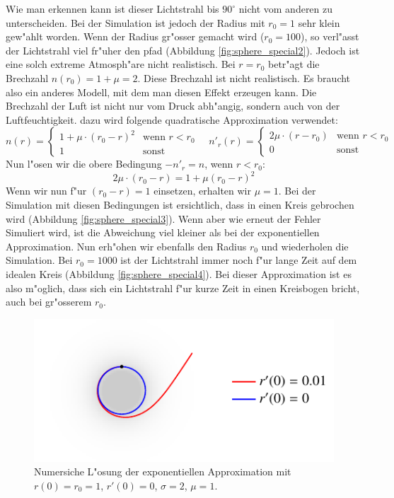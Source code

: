 \begin{refsection}
Wie man erkennen kann ist dieser Lichtstrahl bis $90^\circ$ nicht vom anderen zu unterscheiden.
Bei der Simulation ist jedoch der Radius mit $r_0=1$ sehr klein gew"ahlt worden. 
Wenn der Radius gr"osser gemacht wird ($r_0 = 100$), so  verl"asst der Lichtstrahl viel fr"uher den pfad (Abbildung \ref{fig:sphere_special2}). 
Jedoch ist eine solch extreme Atmosph"are nicht realistisch. 
Bei $r = r_0$ betr"agt die Brechzahl $n(r_0) = 1 + \mu = 2$. 
Diese Brechzahl ist nicht realistisch. 
Es braucht also ein anderes Modell, mit dem man diesen Effekt erzeugen kann.
Die Brechzahl der Luft ist nicht nur vom Druck abh"angig, sondern auch von der Luftfeuchtigkeit. 
dazu wird folgende quadratische Approximation verwendet:
$$n(r) = \left\{ \begin{array}{ll} 1 + \mu \cdot (r_0 - r)^2 & \text{wenn } r < r_0 \\ 1 & \text{sonst} \end{array} \right. \quad n'_r(r) = \left\{ \begin{array}{ll} 2\mu \cdot (r - r_0) & \text{wenn } r < r_0 \\ 0 & \text{sonst} \end{array} \right.$$
Nun l"osen wir die obere Bedingung $-n'_r = n $, wenn $r < r_0$:
$$2\mu \cdot (r_0 - r) = 1 + \mu(r_0 - r)^2$$
Wenn wir nun f"ur $(r_0 - r) = 1$ einsetzen, erhalten wir $\mu = 1$. 
Bei der Simulation mit diesen Bedingungen ist ersichtlich, dass in einen Kreis gebrochen wird (Abbildung \ref{fig:sphere_special3}). 
Wenn aber wie erneut der Fehler Simuliert wird, ist die Abweichung viel kleiner als bei der exponentiellen Approximation. 
Nun erh"ohen wir ebenfalls den Radius $r_0$ und wiederholen die Simulation. 
Bei $r_0 = 1000$ ist der Lichtstrahl immer noch f"ur lange Zeit auf dem idealen Kreis (Abbildung \ref{fig:sphere_special4}). 
Bei dieser Approximation ist es also m"oglich, dass sich ein Lichtstrahl f"ur kurze Zeit in einen Kreisbogen bricht, auch bei gr"osserem $r_0$.
\begin{figure}
  \centering
  \includegraphics[scale=1]{licht/standalone/fig_kreis_exp1.pdf} 
  \caption{Numersiche L"osung der exponentiellen Approximation mit $r(0) = r_0 = 1$, $r'(0) = 0$, $\sigma = 2$, $\mu = 1$. \label{fig:sphere_special1}}


\end{figure}
\end{refsection}
